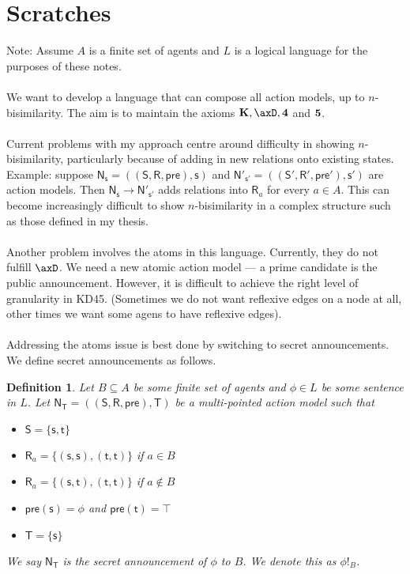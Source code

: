 \documentclass[12pt, a4paper]{article}
\newtheorem{defn}{Definition}[chapter]
\numberwithin{equation}{chapter}
\newcommand{\axK}{\ensuremath{\bf K}}
\newcommand{\axFo}{\ensuremath{\bf 4}}
\newcommand{\axFi}{\ensuremath{\bf 5}}
\newcommand{\aMod}[1]{
  \ensuremath {\mathrm{\mathsf{#1}}}
}
\newcommand{\evMo}{\aMod{N}}
\newcommand{\evM}{\evMo}
\newcommand{\evS}{\aMod{S}}
\newcommand{\evR}{\aMod{R}}
\newcommand{\evpr}{\aMod{pre}}
\newcommand{\evT}{\aMod{T}}
\newcommand{\evs}{\aMod{s}}
\newcommand{\evt}{\aMod{t}}
\begin{document}
\section{Scratches}

Note: Assume $A$ is a finite set of agents and $L$ is a logical language for the purposes of these
notes.\\
\\
We want to develop a language that can compose all action models, up to $n$-bisimilarity.
The aim is to maintain the axioms $\axK, \axD, \axFo$ and $\axFi$.\\
\\
Current problems with my approach centre around difficulty in showing $n$-bisimilarity, particularly
because of adding in new relations onto existing states.
Example: suppose $\evM_\evs = ((\evS, \evR, \evpr), \evs)$ and $\evM'_{\evs'} = ((\evS', \evR',
\evpr'), \evs')$ are action models.
Then $\evM_\evs \to \evM'_{\evs'}$ adds relations into $\evR_a$ for every $a \in A$.
This can become increasingly difficult to show $n$-bisimilarity in a complex structure such as those
defined in my thesis.\\
\\
Another problem involves the atoms in this language.
Currently, they do not fulfill $\axD$.
We need a new atomic action model --- a prime candidate is the public announcement.
However, it is difficult to achieve the right level of granularity in KD45.
(Sometimes we do not want reflexive edges on a node at all, other times we want some agens to have
reflexive edges).\\
\\
Addressing the atoms issue is best done by switching to secret announcements.
We define secret announcements as follows.
\begin{defn}
	Let $B \subseteq A$ be some finite set of agents and $\phi \in L$ be some sentence in $L$.
	Let $\evM_\evT = ((\evS, \evR, \evpr), \evT)$ be a multi-pointed action model such that
	\begin{itemize}
		\item $\evS = \{\evs, \evt\}$
		\item $\evR_a = \{(\evs, \evs), (\evt, \evt)\}$ if $a \in B$
		\item $\evR_a = \{(\evs, \evt), (\evt, \evt)\}$ if $a \notin B$
		\item $\evpr(\evs) = \phi$ and $\evpr(\evt) = \top$
		\item $\evT = \{\evs\}$
	\end{itemize}
	We say $\evM_\evT$ is the {\em secret announcement} of $\phi$ to $B$.
	We denote this as $\phi!_B$.
\end{defn}
\end{document}
